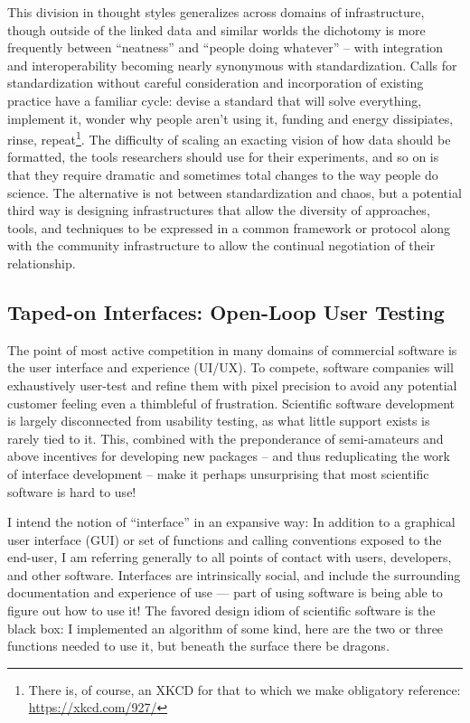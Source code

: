 This division in thought styles generalizes across domains of
infrastructure, though outside of the linked data and similar worlds the
dichotomy is more frequently between ``neatness'' and ``people doing
whatever'' -- with integration and interoperability becoming nearly
synonymous with standardization. Calls for standardization without
careful consideration and incorporation of existing practice have a
familiar cycle: devise a standard that will solve everything, implement
it, wonder why people aren't using it, funding and energy dissipiates,
rinse, repeat\footnote{There is, of course, an XKCD for that to which we
  make obligatory reference: \url{https://xkcd.com/927/}}. The
difficulty of scaling an exacting vision of how data should be
formatted, the tools researchers should use for their experiments, and
so on is that they require dramatic and sometimes total changes to the
way people do science. The alternative is not between standardization
and chaos, but a potential third way is designing infrastructures that
allow the diversity of approaches, tools, and techniques to be expressed
in a common framework or protocol along with the community
infrastructure to allow the continual negotiation of their relationship.

\hypertarget{taped-on-interfaces-open-loop-user-testing}{%
\subsection{Taped-on Interfaces: Open-Loop User
Testing}\label{taped-on-interfaces-open-loop-user-testing}}

The point of most active competition in many domains of commercial
software is the user interface and experience (UI/UX). To compete,
software companies will exhaustively user-test and refine them with
pixel precision to avoid any potential customer feeling even a
thimbleful of frustration. Scientific software development is largely
disconnected from usability testing, as what little support exists is
rarely tied to it. This, combined with the preponderance of
semi-amateurs and above incentives for developing new packages -- and
thus reduplicating the work of interface development -- make it perhaps
unsurprising that most scientific software is hard to use!

I intend the notion of ``interface'' in an expansive way: In addition to
a graphical user interface (GUI) or set of functions and calling
conventions exposed to the end-user, I am referring generally to all
points of contact with users, developers, and other software. Interfaces
are intrinsically social, and include the surrounding documentation and
experience of use --- part of using software is being able to figure out
how to use it! The favored design idiom of scientific software is the
black box: I implemented an algorithm of some kind, here are the two or
three functions needed to use it, but beneath the surface there be
dragons.

